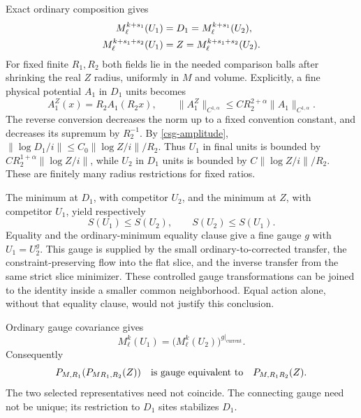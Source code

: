 \documentclass[11pt]{article}
\theoremstyle{remark}
\begin{document}
Exact ordinary composition gives
\begin{align}
 M_\ell^{k+s_1}(U_1)&=D_1=M_\ell^{k+s_1}(U_2),\notag\\
 M_\ell^{k+s_1+s_2}(U_1)&=Z=M_\ell^{k+s_1+s_2}(U_2).
 \label{csg-feasibility}
\end{align}
For fixed finite $R_1,R_2$ both fields lie in the needed
comparison balls after shrinking the real $Z$ radius,
uniformly in $M$ and volume. Explicitly, a fine physical
potential $A_1$ in $D_1$ units becomes
\begin{equation}
 A_1^Z(x)=R_2A_1(R_2x),\qquad
 \|A_1^Z\|_{C^{1,\alpha}}
          \le C R_2^{2+\alpha}\|A_1\|_{C^{1,\alpha}}.
 \label{csg-rescaling}
\end{equation}
The reverse conversion decreases the norm up to a fixed
convention constant, and decreases its supremum by $R_2^{-1}$.
By \eqref{csg-amplitude}, $\|\log D_1/i\|\le C_0\|\log Z/i\|/R_2$.
Thus $U_1$ in final units is bounded by
$CR_2^{1+\alpha}\|\log Z/i\|$, while $U_2$ in $D_1$ units
is bounded by $C\|\log Z/i\|/R_2$. These are finitely many
radius restrictions for fixed ratios.

The minimum at $D_1$, with competitor $U_2$, and the minimum
at $Z$, with competitor $U_1$, yield respectively
\begin{equation}
 S(U_1)\le S(U_2),\qquad S(U_2)\le S(U_1).
 \label{csg-comparisons}
\end{equation}
Equality and the ordinary-minimum equality clause give a
fine gauge $g$ with $U_1=U_2^g$. This gauge is supplied by
the small ordinary-to-corrected transfer, the
constraint-preserving flow into the flat slice, and the
inverse transfer from the same strict slice minimizer.
These controlled gauge transformations can be joined to
the identity inside a smaller common neighborhood.
Equal action alone, without that equality clause, would
not justify this conclusion.

Ordinary gauge covariance gives
\begin{equation}
 M_\ell^k(U_1)=\bigl(M_\ell^k(U_2)\bigr)^{g|_{\mathrm{current}}}.
 \label{csg-gauge-covariance}
\end{equation}
Consequently
\begin{equation}
 P_{M,R_1}(P_{MR_1,R_2}(Z))
       \quad\hbox{is gauge equivalent to}\quad
 P_{M,R_1R_2}(Z).
 \label{csg-orbit-composition}
\end{equation}
The two selected representatives need not coincide. The
connecting gauge need not be unique; its restriction to
$D_1$ sites stabilizes $D_1$.
\end{document}
